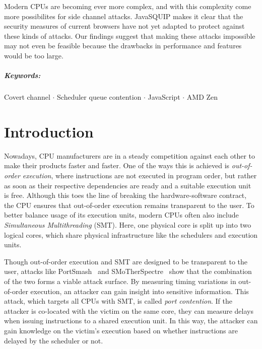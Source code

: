 \documentclass[11pt,
  titlepage=false,
]{scrreprt}
\begin{document}
Modern CPUs are becoming ever more complex, and with this complexity come more possibilites for side channel attacks.
JavaSQUIP makes it clear that the security measures of current browsers have not yet adapted to protect against these kinds of attacks.
Our findings suggest that making these attacks impossible may not even be feasible because the drawbacks in performance and features would be too large.
\paragraph{Keywords:}
Covert channel $\cdot$
Scheduler queue contention $\cdot$
JavaScript $\cdot$
AMD Zen

\clearpage


\chapter{Introduction}
\label{ch:introduction}

Nowadays, CPU manufacturers are in a steady competition against each other to make their products faster and faster.
One of the ways this is achieved is \textit{out-of-order execution}, where instructions are not executed in program order,
but rather as soon as their respective dependencies are ready and a suitable execution unit is free.
Although this toes the line of breaking the hardware-software contract, the CPU ensures that out-of-order execution remains transparent to the user.
To better balance usage of its execution units, modern CPUs often also include \textit{Simultaneous Multithreading} (SMT).
Here, one physical core is split up into two logical cores, which share physical infrastructure like the schedulers and execution units.

Though out-of-order execution and SMT are designed to be transparent to the user, attacks like
PortSmash~\cite{Aldaya2019port} and SMoTherSpectre~\cite{Bhattacharyya2019} show that the combination of the two forms a viable attack surface.
By measuring timing variations in out-of-order execution, an attacker can gain insight into sensitive information.
This attack, which targets all CPUs with SMT, is called \textit{port contention}.
If the attacker is co-located with the victim on the same core, they can measure delays when issuing instructions to a shared execution unit.
In this way, the attacker can gain knowledge on the victim's execution based on whether instructions are delayed by the scheduler or not.
\end{document}
